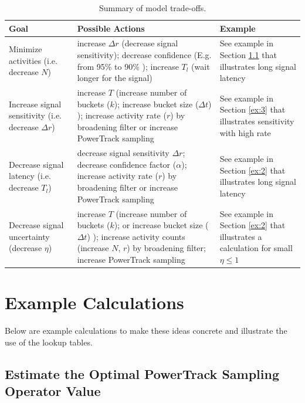 \documentclass{article}
\begin{document}
\begin{table}[!h]
    \begin{tabular}{ p{3.0cm}| p{5.2cm} | p{2.6cm}}
     \hline
Goal  & Possible Actions & Example\\
\hline
Minimize activities (i.e. decrease $N$)  & increase $\Delta r$ (decrease signal sensitivity); decrease 
	confidence (E.g. from 95\% to 90\% ); increase $T_l$ (wait longer for the signal)  & See example 
	in Section \ref{ex:1} that illustrates long signal latency\\
\hline	
Increase signal sensitivity (i.e. decrease $\Delta r$) & increase $T$ (increase number of buckets ($k$); 
	increase bucket size ($\Delta t$) ); increase activity rate ($r$) by broadening filter or increase 
	PowerTrack sampling  & See example in Section \ref{ex:3} that illustrates sensitivity with high rate\\
\hline
Decrease signal latency  (i.e. decrease $T_l$)   & decrease signal sensitivity $\Delta r$;
	decrease confidence factor ($\alpha$); increase activity rate ($r$) by broadening filter 
	or increase PowerTrack sampling  & See example in Section \ref{ex:2} that illustrates long signal latency\\
\hline
Decrease signal uncertainty   (decrease $\eta$)  & increase $T$ (increase number of buckets ($k$); or 
	increase bucket size ($\Delta t$) ); increase activity counts (increase $N$, $r$) by broadening 
	filter; increase PowerTrack sampling & See example in Section \ref{ex:2} that illustrates a calculation
	for small $\eta \le 1$\\
\hline
\end{tabular}
\caption{Summary of model trade-offs.}
\label{tab:tradeoff}

\end{table}

\section{Example Calculations} 
\label{examples}

Below are example calculations to make these ideas concrete and illustrate the use of the lookup tables.

\subsection{Estimate the Optimal PowerTrack Sampling Operator Value} 
\label{ex:1}
\end{document}
